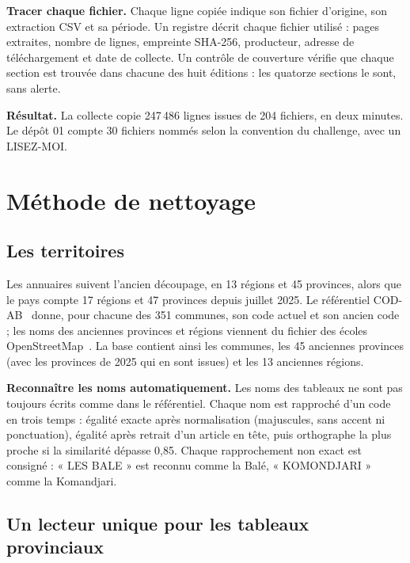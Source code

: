 \documentclass{article}
\begin{document}
\textbf{Tracer chaque fichier.} Chaque ligne copiée indique son fichier d'origine, son extraction CSV et sa période. Un registre décrit chaque fichier utilisé : pages extraites, nombre de lignes, empreinte SHA-256, producteur, adresse de téléchargement et date de collecte. Un contrôle de couverture vérifie que chaque section est trouvée dans chacune des huit éditions : les quatorze sections le sont, sans alerte.

\textbf{Résultat.} La collecte copie 247\,486 lignes issues de 204 fichiers, en deux minutes. Le dépôt 01 compte 30 fichiers nommés selon la convention du challenge, avec un LISEZ-MOI.

\section{Méthode de nettoyage}

\subsection{Les territoires}

Les annuaires suivent l'ancien découpage, en 13 régions et 45 provinces, alors que le pays compte 17 régions et 47 provinces depuis juillet 2025. Le référentiel COD-AB~\cite{codab} donne, pour chacune des 351 communes, son code actuel et son ancien code ; les noms des anciennes provinces et régions viennent du fichier des écoles OpenStreetMap~\cite{hotosm}. La base contient ainsi les communes, les 45 anciennes provinces (avec les provinces de 2025 qui en sont issues) et les 13 anciennes régions.

\textbf{Reconnaître les noms automatiquement.} Les noms des tableaux ne sont pas toujours écrits comme dans le référentiel. Chaque nom est rapproché d'un code en trois temps : égalité exacte après normalisation (majuscules, sans accent ni ponctuation), égalité après retrait d'un article en tête, puis orthographe la plus proche si la similarité dépasse 0,85. Chaque rapprochement non exact est consigné : « LES BALE » est reconnu comme la Balé, « KOMONDJARI » comme la Komandjari.

\subsection{Un lecteur unique pour les tableaux provinciaux}
\end{document}

